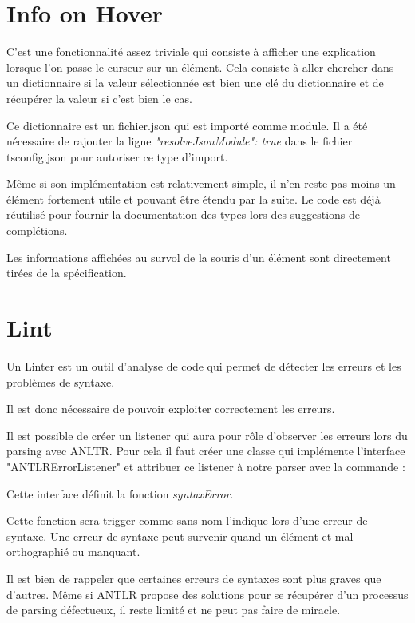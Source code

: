 \documentclass[
    iict, %
    il, %
]{heig-tb}
\begin{document}
\section{Info on Hover}


C'est une fonctionnalité assez triviale qui consiste à afficher une explication lorsque l'on passe le curseur sur un élément.
Cela consiste à aller chercher dans un dictionnaire si la valeur sélectionnée est bien une clé du dictionnaire et de récupérer la valeur si c'est bien le cas.

Ce dictionnaire est un fichier.json qui est importé comme module. Il a été nécessaire de rajouter la ligne \emph{"resolveJsonModule": true} dans le fichier tsconfig.json pour autoriser ce type d'import.

Même si son implémentation est relativement simple, il n'en reste pas moins un élément fortement utile et pouvant être étendu par la suite.
Le code est déjà réutilisé pour fournir la documentation des types lors des suggestions de complétions.

Les informations affichées au survol de la souris d’un élément sont directement tirées de la spécification.

\section{Lint}
Un Linter est un outil d'analyse de code qui permet de détecter les erreurs et les problèmes de syntaxe.

Il est donc nécessaire de pouvoir exploiter correctement les erreurs.

Il est possible de créer un listener qui aura pour rôle d'observer les erreurs lors du parsing avec ANLTR.
Pour cela il faut créer une classe qui implémente l'interface "ANTLRErrorListener" et attribuer ce listener à notre parser
avec la commande :

Cette interface définit la fonction \emph{syntaxError}.

Cette fonction sera trigger comme sans nom l'indique lors d'une erreur de syntaxe.
Une erreur de syntaxe peut survenir quand un élément et mal orthographié ou manquant.

Il est bien de rappeler que certaines erreurs de syntaxes sont plus graves que d'autres.
Même si ANTLR propose des solutions pour se récupérer d'un processus de parsing défectueux, il reste limité et ne peut pas faire de miracle.
\end{document}

